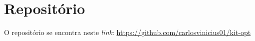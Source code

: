 \appendix

\chapter{Repositório}
O repositório se encontra neste \textit{link}: \url{https://github.com/carlosvinicius01/kit-opt}